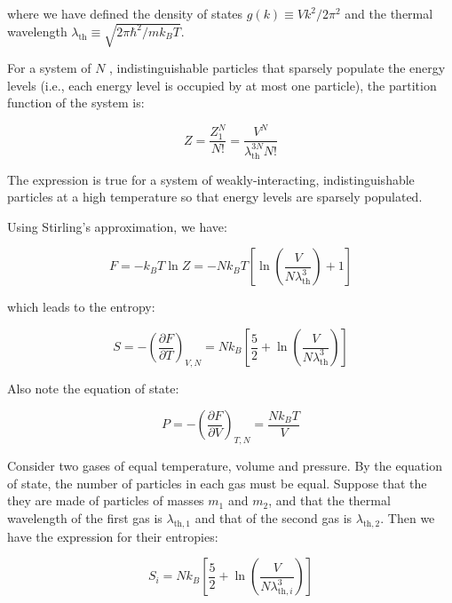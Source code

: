 \documentclass[12pt]{article}
\begin{document}
where we have defined the density of states $g(k) \equiv Vk^{2}/2\pi^{2}$ and the thermal wavelength $\lambda_{\text{th}} \equiv \sqrt{2\pi\hbar^{2}/m k_{B}T}$.

For a system of $N$ , indistinguishable particles that sparsely populate the energy levels (i.e., each energy level is occupied by at most one particle), the partition function of the system is:

\begin{equation}
    Z = \frac{Z_{1}^{N}}{N!} = \frac{V^{N}}{\lambda_{\text{th}}^{3N} N!}
\end{equation}

\begin{correction}
    The expression is true for a system of weakly-interacting, indistinguishable particles at a high temperature so that energy levels are sparsely populated.
\end{correction}

Using Stirling's approximation, we have:

\begin{equation}
    F = -k_{B}T \ln{Z} = -Nk_{B}T \left[ \ln{\left( \frac{V}{N\lambda_{\text{th}}^{3}} \right)} + 1 \right]
\end{equation}

which leads to the entropy:

\begin{equation}
    S = -\left( \frac{\partial F}{\partial T} \right)_{V, N} = Nk_{B} \left[ \frac{5}{2} + \ln{\left( \frac{V}{N\lambda_{\text{th}}^{3}} \right)} \right]
\end{equation}

Also note the equation of state:

\begin{equation}
    P = -\left( \frac{\partial F}{\partial V} \right)_{T, N} = \frac{Nk_{B}T}{V}
\end{equation}

Consider two gases of equal temperature, volume and pressure. By the equation of state, the number of particles in each gas must be equal. Suppose that the they are made of particles of masses $m_{1}$ and $m_{2}$, and that the thermal wavelength of the first gas is $\lambda_{\text{th}, 1}$ and that of the second gas is $\lambda_{\text{th}, 2}$. Then we have the expression for their entropies:

\begin{equation}
    S_{i} = Nk_{B} \left[ \frac{5}{2} + \ln{\left( \frac{V}{N\lambda_{\text{th}, i}^{3}} \right)} \right]
\end{equation}
\end{document}
